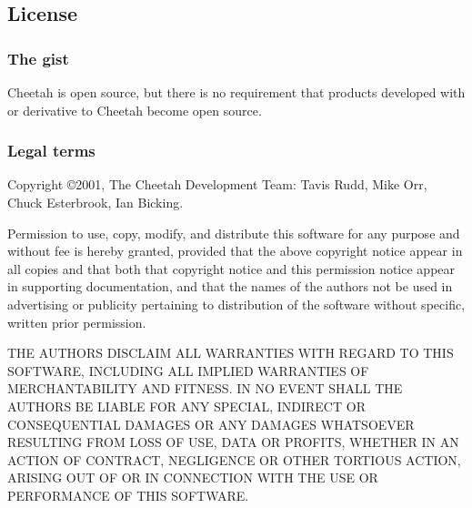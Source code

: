 \subsection{License}
\label{intro.license}

\subsubsection{The gist}
Cheetah is open source, but there is no requirement that products developed with
or derivative to Cheetah become open source.

\subsubsection{Legal terms}
Copyright \copyright 2001, The Cheetah Development Team: Tavis Rudd, Mike Orr,
Chuck Esterbrook, Ian Bicking.

Permission to use, copy, modify, and distribute this software for any purpose
and without fee is hereby granted, provided that the above copyright notice
appear in all copies and that both that copyright notice and this permission
notice appear in supporting documentation, and that the names of the authors not
be used in advertising or publicity pertaining to distribution of the software
without specific, written prior permission.

THE AUTHORS DISCLAIM ALL WARRANTIES WITH REGARD TO THIS SOFTWARE, INCLUDING ALL
IMPLIED WARRANTIES OF MERCHANTABILITY AND FITNESS. IN NO EVENT SHALL THE AUTHORS
BE LIABLE FOR ANY SPECIAL, INDIRECT OR CONSEQUENTIAL DAMAGES OR ANY DAMAGES
WHATSOEVER RESULTING FROM LOSS OF USE, DATA OR PROFITS, WHETHER IN AN ACTION OF
CONTRACT, NEGLIGENCE OR OTHER TORTIOUS ACTION, ARISING OUT OF OR IN CONNECTION
WITH THE USE OR PERFORMANCE OF THIS SOFTWARE.

